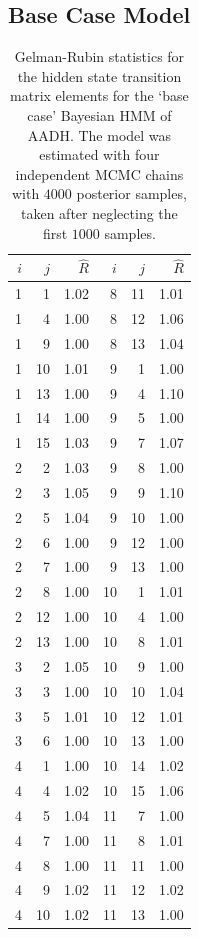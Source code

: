 \subsection{Base Case Model}
\begin{table}
 \centering
 \caption{Gelman-Rubin statistics for the hidden state transition matrix elements for the `base case' Bayesian HMM of AADH. The model was estimated with four independent MCMC chains with $4000$ posterior samples, taken after neglecting the first $1000$ samples. }
 \label{tab:aadh_base_case_rhat}
 \begin{tabular}{|r|r|r||r|r|r|}
 \hline
 $i$ & $j$ & $\hat{R}$ & $i$ & $j$ & $\hat{R}$ \\
 \hline\hline
 1 & 1 & 1.02 & 8 & 11 & 1.01 \\
 1 & 4 & 1.00 & 8 & 12 & 1.06 \\
 1 & 9 & 1.00 & 8 & 13 & 1.04 \\
 1 & 10 & 1.01 & 9 & 1 & 1.00 \\
 1 & 13 & 1.00 & 9 & 4 & 1.10 \\
 1 & 14 & 1.00 & 9 & 5 & 1.00 \\
 1 & 15 & 1.03 & 9 & 7 & 1.07 \\
 2 & 2 & 1.03 & 9 & 8 & 1.00 \\
 2 & 3 & 1.05 & 9 & 9 & 1.10 \\
 2 & 5 & 1.04 & 9 & 10 & 1.00 \\
 2 & 6 & 1.00 & 9 & 12 & 1.00 \\
 2 & 7 & 1.00 & 9 & 13 & 1.00 \\
 2 & 8 & 1.00 & 10 & 1 & 1.01 \\
 2 & 12 & 1.00 & 10 & 4 & 1.00 \\
 2 & 13 & 1.00 & 10 & 8 & 1.01 \\
 3 & 2 & 1.05 & 10 & 9 & 1.00 \\
 3 & 3 & 1.00 & 10 & 10 & 1.04 \\
 3 & 5 & 1.01 & 10 & 12 & 1.01 \\
 3 & 6 & 1.00 & 10 & 13 & 1.00 \\
 4 & 1 & 1.00 & 10 & 14 & 1.02 \\
 4 & 4 & 1.02 & 10 & 15 & 1.06 \\
 4 & 5 & 1.04 & 11 & 7 & 1.00 \\
 4 & 7 & 1.00 & 11 & 8 & 1.01 \\
 4 & 8 & 1.00 & 11 & 11 & 1.00 \\
 4 & 9 & 1.02 & 11 & 12 & 1.02 \\
 4 & 10 & 1.02 & 11 & 13 & 1.00 \\

\end{tabular}
\end{table}
